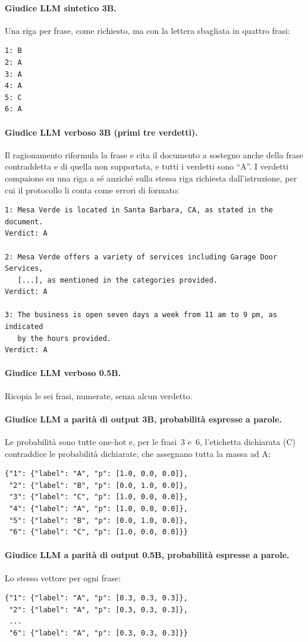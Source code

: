 \paragraph{Giudice LLM sintetico 3B.} Una riga per frase, come richiesto, ma con la lettera sbagliata in quattro frasi:
{\footnotesize
\begin{verbatim}
1: B
2: A
3: A
4: A
5: C
6: A
\end{verbatim}
}

\paragraph{Giudice LLM verboso 3B (primi tre verdetti).} Il ragionamento riformula la frase e cita il documento a
sostegno anche della frase contraddetta e di quella non supportata, e tutti i verdetti sono ``A''. I verdetti compaiono
su una riga a sé anziché sulla stessa riga richiesta dall'istruzione, per cui il protocollo li conta come errori di
formato:
{\footnotesize
\begin{verbatim}
1: Mesa Verde is located in Santa Barbara, CA, as stated in the document.
Verdict: A

2: Mesa Verde offers a variety of services including Garage Door Services,
   [...], as mentioned in the categories provided.
Verdict: A

3: The business is open seven days a week from 11 am to 9 pm, as indicated
   by the hours provided.
Verdict: A
\end{verbatim}
}

\paragraph{Giudice LLM verboso 0.5B.} Ricopia le sei frasi, numerate, senza alcun verdetto.

\paragraph{Giudice LLM a parità di output 3B, probabilità espresse a parole.} Le probabilità sono tutte one-hot e, per le
frasi~3 e~6, l'etichetta dichiarata (C) contraddice le probabilità dichiarate, che assegnano tutta la massa ad A:
{\footnotesize
\begin{verbatim}
{"1": {"label": "A", "p": [1.0, 0.0, 0.0]},
 "2": {"label": "B", "p": [0.0, 1.0, 0.0]},
 "3": {"label": "C", "p": [1.0, 0.0, 0.0]},
 "4": {"label": "A", "p": [1.0, 0.0, 0.0]},
 "5": {"label": "B", "p": [0.0, 1.0, 0.0]},
 "6": {"label": "C", "p": [1.0, 0.0, 0.0]}}
\end{verbatim}
}

\paragraph{Giudice LLM a parità di output 0.5B, probabilità espresse a parole.} Lo stesso vettore per ogni frase:
{\footnotesize
\begin{verbatim}
{"1": {"label": "A", "p": [0.3, 0.3, 0.3]},
 "2": {"label": "A", "p": [0.3, 0.3, 0.3]},
 ...
 "6": {"label": "A", "p": [0.3, 0.3, 0.3]}}
\end{verbatim}
}
